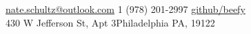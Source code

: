 \documentclass[10pt,a4paper]{article} %
\begin{document}
 



\noindent\href{mailto:nate.schultz@outlook.com}{nate.schultz@outlook.com}\bull %
\textsmaller{+}1 (978) 201-2997\bull %
\href{https://github.com/beefy}{github/beefy}\\ %
430 W Jefferson St, Apt 3\bull Philadelphia PA, 19122 %

\spacedhrule{0.9em}{-0.4em} %





\end{document}
